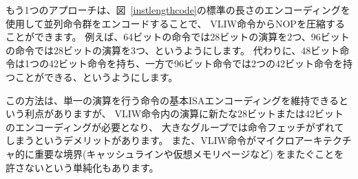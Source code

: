 \begin{comment}
\subsection*{Encoded-Length Groups}
\end{comment}

\begin{comment}
Another approach is to use the standard length encoding from
Figure~\ref{instlengthcode} to encode parallel instruction groups,
allowing NOPs to be compressed out of the VLIW instruction.  For
example, a 64-bit instruction could hold two 28-bit operations, while
a 96-bit instruction could hold three 28-bit operations, and so on.
Alternatively, a 48-bit instruction could hold one 42-bit operation,
while a 96-bit instruction could hold two 42-bit operations, and so
on.
\end{comment}
もう1つのアプローチは、図~\ref{instlengthcode}の標準の長さのエンコーディングを使用して並列命令群をエンコードすることで、
VLIW命令からNOPを圧縮することができます。
例えば、64ビットの命令では28ビットの演算を2つ、96ビットの命令では28ビットの演算を3つ、というようにします。
代わりに、48ビット命令は1つの42ビット命令を持ち、一方で96ビット命令では2つの42ビット命令を持つことができる、というようにします。

\begin{comment}
This approach has the advantage of retaining the base ISA encoding for
instructions holding a single operation, but has the disadvantage of
requiring a new 28-bit or 42-bit encoding for operations within the
VLIW instructions, and misaligned instruction fetch for larger groups.
One simplification is to not allow VLIW instructions to straddle
certain microarchitecturally significant boundaries (e.g., cache lines
or virtual memory pages).
\end{comment}
この方法は、単一の演算を行う命令の基本ISAエンコーディングを維持できるという利点がありますが、
VLIW命令内の演算に新たな28ビットまたは42ビットのエンコーディングが必要となり、
大きなグループでは命令フェッチがずれてしまうというデメリットがあります。
また、VLIW命令がマイクロアーキテクチャ的に重要な境界(キャッシュラインや仮想メモリページなど)
をまたぐことを許さないという単純化もあります。

\begin{comment}
\subsection*{Fixed-Size Instruction Bundles}
\end{comment}
